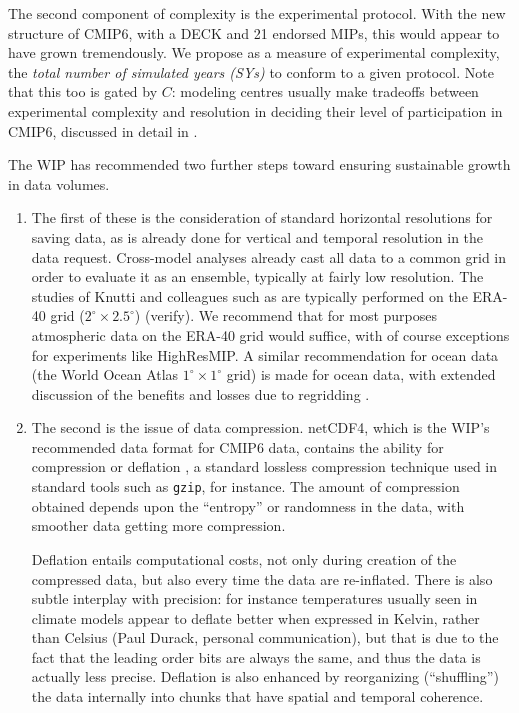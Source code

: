 \documentclass[gmd,manuscript]{copernicus}
\newcommand{\bibref}[1] { \cite{ref:#1}}
\newcommand{\pipref}[1] {\citep{ref:#1}}
\begin{document}
\begin{description}
  The second component of complexity is the experimental protocol.
  With the new structure of CMIP6, with a DECK and 21 endorsed MIPs,
  this would appear to have grown tremendously. We propose as a
  measure of experimental complexity, the \emph{total number of
    simulated years (SYs)} to conform to a given protocol. Note that
  this too is gated by $C$: modeling centres usually make tradeoffs
  between experimental complexity and resolution in deciding their
  level of participation in CMIP6, discussed in detail in
  \bibref{balajietal2017}.
\end{description}

The WIP has recommended two further steps toward ensuring sustainable
growth in data volumes.

\begin{enumerate}
\item The first of these is the consideration of standard horizontal
  resolutions for saving data, as is already done for vertical and
  temporal resolution in the data request. Cross-model analyses
  already cast all data to a common grid in order to evaluate it as an
  ensemble, typically at fairly low resolution. The studies of Knutti
  and colleagues such as \bibref{knuttietal2017} are typically
  performed on the ERA-40 grid ($2^\circ\times 2.5^\circ$) (verify).
  We recommend that for most purposes atmospheric data on the ERA-40
  grid would suffice, with of course exceptions for experiments like
  HighResMIP. A similar recommendation for ocean data (the World Ocean
  Atlas $1^\circ\times 1^\circ$ grid) is made for ocean data, with
  extended discussion of the benefits and losses due to regridding
  \citep[see][]{ref:griffiesetal2014,ref:griffiesetal2016}.
\item The second is the issue of data compression. netCDF4, which is
  the WIP's recommended data format for CMIP6 data, contains the
  ability for compression or deflation \pipref{zivlempel1977}, a
  standard lossless compression technique used in standard tools such
  as \texttt{gzip}, for instance. The amount of compression obtained
  depends upon the ``entropy'' or randomness in the data, with
  smoother data getting more compression.

  Deflation entails computational costs, not only during creation of
  the compressed data, but also every time the data are re-inflated.
  There is also subtle interplay with precision: for instance
  temperatures usually seen in climate models appear to deflate better
  when expressed in Kelvin, rather than Celsius (Paul Durack, personal
  communication), but that is due to the fact that the leading order
  bits are always the same, and thus the data is actually less
  precise. Deflation is also enhanced by reorganizing (``shuffling'')
  the data internally into chunks that have spatial and temporal
  coherence.


\end{enumerate}
\end{document}
